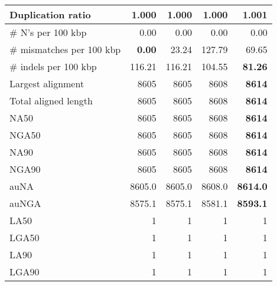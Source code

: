 \documentclass[12pt,a4paper]{article}
\begin{document}
\begin{table}[ht]
\begin{center}
\begin{tabular}{|l*{4}{|r}|}
Duplication ratio & {\bf 1.000} & {\bf 1.000} & {\bf 1.000} & 1.001 \\ \hline
\# N's per 100 kbp & 0.00 & 0.00 & 0.00 & 0.00 \\ \hline
\# mismatches per 100 kbp & {\bf 0.00} & 23.24 & 127.79 & 69.65 \\ \hline
\# indels per 100 kbp & 116.21 & 116.21 & 104.55 & {\bf 81.26} \\ \hline
Largest alignment & 8605 & 8605 & 8608 & {\bf 8614} \\ \hline
Total aligned length & 8605 & 8605 & 8608 & {\bf 8614} \\ \hline
NA50 & 8605 & 8605 & 8608 & {\bf 8614} \\ \hline
NGA50 & 8605 & 8605 & 8608 & {\bf 8614} \\ \hline
NA90 & 8605 & 8605 & 8608 & {\bf 8614} \\ \hline
NGA90 & 8605 & 8605 & 8608 & {\bf 8614} \\ \hline
auNA & 8605.0 & 8605.0 & 8608.0 & {\bf 8614.0} \\ \hline
auNGA & 8575.1 & 8575.1 & 8581.1 & {\bf 8593.1} \\ \hline
LA50 & 1 & 1 & 1 & 1 \\ \hline
LGA50 & 1 & 1 & 1 & 1 \\ \hline
LA90 & 1 & 1 & 1 & 1 \\ \hline
LGA90 & 1 & 1 & 1 & 1 \\ \hline
\end{tabular}
\end{center}
\end{table}
\end{document}
